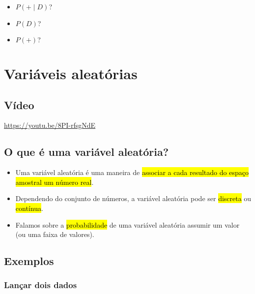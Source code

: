 \documentclass[
  11pt]{report}
\begin{document}
\begin{itemize}
  \begin{itemize}
  \item
    $P(+ \mid D)$?
  \item
    $P(D)$?
  \item
    $P(+)$?
  \end{itemize}
\end{itemize}

\hypertarget{variaveis}{%
\chapter{Variáveis aleatórias}\label{variaveis}}

\hypertarget{vuxeddeo-3}{%
\section{Vídeo}\label{vuxeddeo-3}}

\begin{center} \url{https://youtu.be/8PI-rfsgNdE} \end{center}

\hypertarget{o-que-uxe9-uma-variuxe1vel-aleatuxf3ria}{%
\section{O que é uma variável aleatória?}\label{o-que-uxe9-uma-variuxe1vel-aleatuxf3ria}}

\begin{itemize}
\item
  Uma variável aleatória é uma maneira de {\hl{associar a cada resultado do espaço amostral um número real}}.
\item
  Dependendo do conjunto de números, a variável aleatória pode ser {\hl{discreta}} ou {\hl{contínua}}.
\item
  Falamos sobre a {\hl{probabilidade}} de uma variável aleatória assumir um valor (ou uma faixa de valores).
\end{itemize}

\hypertarget{exemplos-1}{%
\section{Exemplos}\label{exemplos-1}}

\hypertarget{lanuxe7ar-dois-dados}{%
\subsection{Lançar dois dados}\label{lanuxe7ar-dois-dados}}
\end{document}
